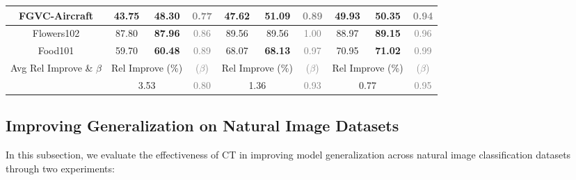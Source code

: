 \begin{table*}[t]
\begin{center}
\begin{small}
{\begin{tabular}{|c|c|c|c|c|c|c|c|c|c|}
FGVC-Aircraft     & 43.75 & \textbf{48.30} & \textcolor{gray}{0.77} 
                  & 47.62 & \textbf{51.09} & \textcolor{gray}{0.89} 
                  & 49.93 & \textbf{50.35} & \textcolor{gray}{0.94} \\ \hline
Flowers102        & 87.80 & \textbf{87.96} & \textcolor{gray}{0.86} 
                  & 89.56 & 89.56 & \textcolor{gray}{1.00} 
                  & 88.97 & \textbf{89.15} & \textcolor{gray}{0.96} \\ \hline
Food101           & 59.70 & \textbf{60.48} & \textcolor{gray}{0.89} 
                  & 68.07 & \textbf{68.13} & \textcolor{gray}{0.97} 
                  & 70.95 & \textbf{71.02} & \textcolor{gray}{0.99} \\ \hline
\multirow{2}{*}{Avg Rel Improve \& $\beta$} & \multicolumn{2}{c|}{Rel Improve (\%)} & \textcolor{gray}{($\beta$)} & \multicolumn{2}{c|}{Rel Improve (\%)} & \textcolor{gray}{($\beta$)} & \multicolumn{2}{c|}{Rel Improve (\%)} & \textcolor{gray}{($\beta$)} \\ \cline{2-10} 
                  & \multicolumn{2}{c|}{3.53} 
                  & \textcolor{gray}{0.80}
                  & \multicolumn{2}{c|}{1.36} 
                  & \textcolor{gray}{0.93}
                  & \multicolumn{2}{c|}{0.77} 
                  & \textcolor{gray}{0.95} \\ \hline
\end{tabular}
}
\end{small}
\end{center}
\vskip -0.1in
\end{table*}

\subsection{Improving Generalization on Natural Image Datasets}\label{sec:exp-natural-img}
In this subsection, we evaluate the effectiveness of CT in improving model generalization across natural image classification datasets through two experiments:

